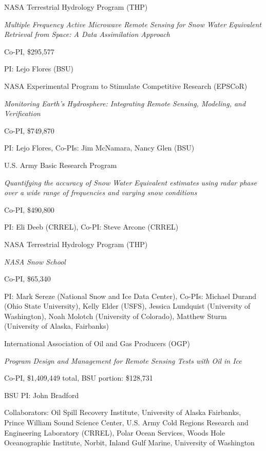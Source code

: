 \documentclass[11pt]{article}
\renewenvironment{itemize}{
  \begin{list}{}{
    \setlength{\leftmargin}{1.5em}
    \setlength{\itemsep}{0pt}
    \setlength{\parskip}{0pt}
  }
}{
  \end{list}
}
\begin{document}
\begin{itemize}
\item[7/2015-6/2018] NASA Terrestrial Hydrology Program (THP)
\begin{itemize}
\item \textit{Multiple Frequency Active Microwave Remote Sensing for Snow Water Equivalent Retrieval from Space: A Data Assimilation Approach}
\item Co-PI, \$295,577
\item PI: Lejo Flores (BSU)
\end{itemize}

\item[6/2014-6/2018] NASA Experimental Program to Stimulate Competitive Research (EPSCoR)
\begin{itemize}
\item \textit{Monitoring Earth's Hydrosphere: Integrating Remote Sensing, Modeling, and Verification}
\item Co-PI, \$749,870
\item PI: Lejo Flores, Co-PIs: Jim McNamara, Nancy Glen (BSU)
\end{itemize}

\item[10/2013-9/2016] U.S. Army Basic Research Program
\begin{itemize}
\item \textit{Quantifying the accuracy of Snow Water Equivalent estimates using radar phase over a wide range of frequencies and varying snow conditions}
\item Co-PI, \$490,800
\item PI: Eli Deeb (CRREL), Co-PI: Steve Arcone (CRREL)
\end{itemize}

\item[1/2014-12/2014] NASA Terrestrial Hydrology Program (THP)
\begin{itemize}
\item \textit{NASA Snow School}
\item Co-PI, \$65,340
\item PI: Mark Sereze (National Snow and Ice Data Center), Co-PIs: Michael Durand (Ohio State University), Kelly Elder (USFS),
Jessica Lundquist (University of Washington), Noah Molotch (University of Colorado), Matthew Sturm (University of Alaska, Fairbanks)
\end{itemize}

\item[01/2014-12/2014] International Association of Oil and Gas Producers (OGP)
\begin{itemize}
\item \textit{Program Design and Management for Remote Sensing Tests with Oil in Ice}
\item Co-PI, \$1,409,449 total, BSU portion: \$128,731
\item BSU PI: John Bradford
\item Collaborators: Oil Spill Recovery Institute, University of Alaska Fairbanks, Prince William Sound Science Center, U.S. Army Cold Regions Research and Engineering Laboratory (CRREL), Polar Ocean Services, Woods Hole Oceanographic Institute, Norbit, Inland Gulf Marine, University of Washington
\end{itemize}


\end{itemize}
\end{document}
